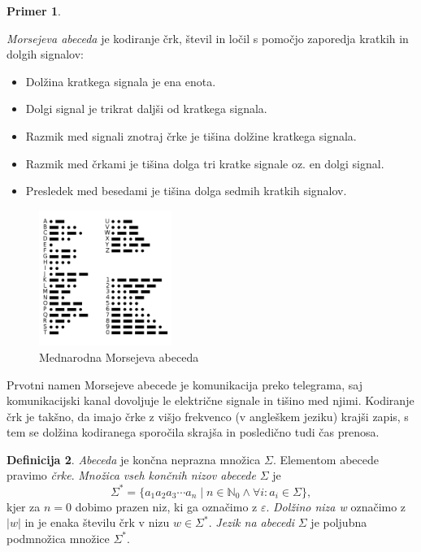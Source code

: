 \documentclass{amsart}
\newcommand{\N}{\mathbb{N}}
\theoremstyle{definition} %
\newtheorem{definicija}{Definicija}[section]
\newtheorem{primer}[definicija]{Primer}
\theoremstyle{plain} %
\begin{document}
\begin{primer}\label{Morse}

    \textit{Morsejeva abeceda} je kodiranje črk, števil in ločil s pomočjo zaporedja kratkih
    in dolgih signalov:

    \begin{itemize}
        \item Dolžina kratkega signala je ena enota.
        \item Dolgi signal je trikrat daljši od kratkega signala.
        \item Razmik med signali znotraj črke je tišina dolžine kratkega signala.
        \item Razmik med črkami je tišina dolga tri kratke signale oz. en dolgi signal.
        \item Presledek med besedami je tišina dolga sedmih kratkih signalov.
    \end{itemize}

    \begin{figure}[h]
        \centering
        \includegraphics[width=4.3cm]{International_Morse_Code.svg.png}
        \caption{Mednarodna Morsejeva abeceda}
        \label{fig:Morse}
    \end{figure}

    Prvotni namen Morsejeve abecede je komunikacija preko telegrama, saj komunikacijski
    kanal dovoljuje le električne signale in tišino med njimi. Kodiranje črk je takšno,
    da imajo črke z višjo frekvenco (v angleškem jeziku) krajši zapis, s tem se dolžina
    kodiranega sporočila skrajša in posledično tudi čas prenosa.

\end{primer}

\begin{definicija}

    \textit{Abeceda} je končna neprazna množica $ \Sigma $. Elementom abecede pravimo \textit{črke}.
    \textit{Množica vseh končnih nizov abecede} $ \Sigma $ je
    \[
        \Sigma^* = \{ a_1 a_2 a_3 \cdots a_n \mid n \in \N_0 \land \forall i: a_i \in \Sigma \}, 
    \]
    kjer za $ n = 0 $ dobimo prazen niz, ki ga označimo z $ \varepsilon $.
    \textit{Dolžino niza w} označimo z $ |w| $ in je enaka številu črk v nizu $ w \in \Sigma^* $.
    \textit{Jezik na abecedi} $ \Sigma $ je poljubna podmnožica množice $ \Sigma^* $. 

\end{definicija}
\end{document}
